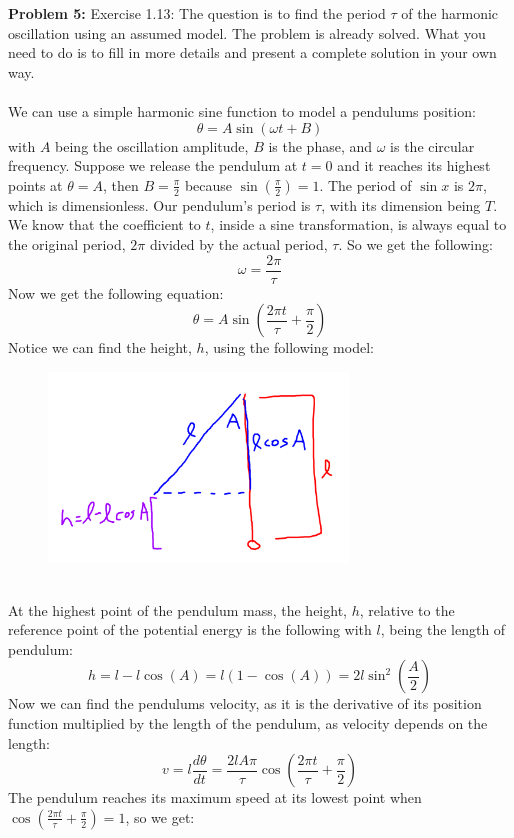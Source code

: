 \documentclass[11pt]{article}
\newenvironment{problem}[1]{\textbf{Problem #1: }}{\newpage}
\begin{document}
	\begin{problem}{5}
		Exercise 1.13: The question is to find the period $\tau$ of the harmonic oscillation
		using an assumed model. The problem is already solved. What you need to do is
		to fill in more details and present a complete solution in your own way. 
		\\ \\
		We can use a simple harmonic sine function to model a pendulums position:
		\[\theta = A\sin(\omega t + B)\]
		with $A$ being the oscillation amplitude, $B$ is the phase, and $\omega$ is the circular frequency. 
		Suppose we release the pendulum at $t = 0$ and it reaches its highest points at $\theta = A$, then $B = \frac{\pi}{2}$ because $\sin\left(\frac{\pi}{2}\right)= 1$.  The period of $\sin x$ is $2\pi$, which is dimensionless.  Our pendulum's period is $\tau$, with its dimension being $T$. We know that the coefficient to $t$, inside a sine transformation, is always equal to the original period, $2\pi$ divided by the actual period, $\tau$.  So we get the following:
		\[\omega = \frac{2\pi}{\tau}\]
		Now we get the following equation:
		\[\theta = A\sin\left(\frac{2\pi t}{\tau} + \frac{\pi}{2}\right)\]
		Notice we can find the height, $h$, using the following model:
		\begin{figure}[h!]
			\centering
			\includegraphics[width = 8cm]{Photos/Pendulum.png}
		\end{figure}
		\\
		At the highest point of the pendulum mass, the height, $h$, relative to the reference point of the potential energy is the following with $l$, being the length of pendulum:
		\[h = l - l\cos(A) = l(1 - \cos(A)) = 2l\sin^2\left(\frac{A}{2}\right)\]
		Now we can find the pendulums velocity, as it is the derivative of its position function multiplied by the length of the pendulum, as velocity depends on the length:
		\[v = l\frac{d\theta}{dt} = \frac{2lA\pi}{\tau}\cos\left(\frac{2\pi t}{\tau} + \frac{\pi}{2}\right)\]
		The pendulum reaches its maximum speed at its lowest point when $\cos\left(\frac{2\pi t}{\tau} + \frac{\pi}{2}\right) = 1$, so we get:

\end{problem}
\end{document}
